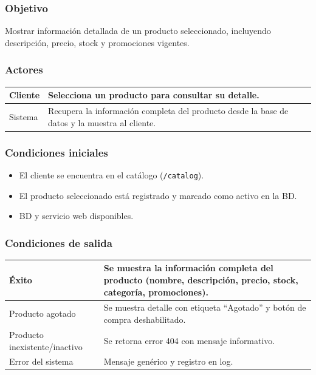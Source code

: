\documentclass[12pt,a4paper]{article}
\begin{document}
\subsubsection*{Objetivo}
Mostrar información detallada de un producto seleccionado, incluyendo descripción, precio, stock y promociones vigentes.

\subsubsection*{Actores}
\begin{longtable}{|l|p{10cm}|}
    \hline
    Cliente & Selecciona un producto para consultar su detalle.                                             \\ \hline
    Sistema & Recupera la información completa del producto desde la base de datos y la muestra al cliente. \\ \hline
\end{longtable}

\subsubsection*{Condiciones iniciales}
\begin{itemize}[label=--]
    \item El cliente se encuentra en el catálogo (\texttt{/catalog}).
    \item El producto seleccionado está registrado y marcado como activo en la BD.
    \item BD y servicio web disponibles.
\end{itemize}

\subsubsection*{Condiciones de salida}
\begin{longtable}{|l|p{10cm}|}
    \hline
    Éxito                         & Se muestra la información completa del producto (nombre, descripción, precio, stock, categoría, promociones). \\ \hline
    Producto agotado              & Se muestra detalle con etiqueta “Agotado” y botón de compra deshabilitado.                                    \\ \hline
    Producto inexistente/inactivo & Se retorna error 404 con mensaje informativo.                                                                 \\ \hline
    Error del sistema             & Mensaje genérico y registro en log.                                                                           \\ \hline
\end{longtable}
\end{document}
